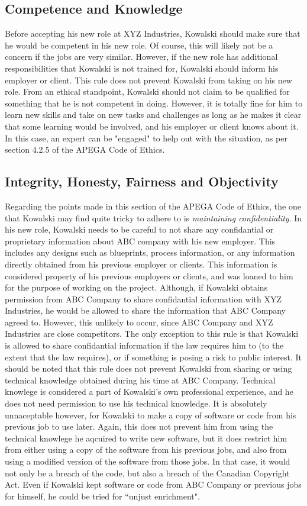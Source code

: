 \documentclass[letterpaper,12pt]{article}
\begin{document}
\subsection{Competence and Knowledge}
Before accepting his new role at XYZ Industries, Kowalski should make sure that he would be competent in his new role.
Of course, this will likely not be a concern if the jobs are very similar. However, if the new role has additional responsibilities that Kowalski
is not trained for, Kowalski should inform his employer or client. This rule does not prevent Kowalski from taking on his new role. From an ethical standpoint,
Kowalski should not claim to be qualified for something that he is not competent in doing. However, it is totally fine for him to learn new skills and take on
new tasks and challenges as long as he makes it clear that some learning would be involved, and his employer or client knows about it. 
In this case, an expert can be "engaged" to help out with the situation, as per section 4.2.5 of the APEGA Code of Ethics.\cite{apegacode}

\subsection{Integrity, Honesty, Fairness and Objectivity}
Regarding the points made in this section of the APEGA Code of Ethics, the one that Kowalski may find quite tricky to
adhere to is \textit{maintaining confidentiality}. In his new role, Kowalski needs to be careful to not share
any confidantial or proprietary information about ABC company with his new employer. This includes any designs such as blueprints,
process information, or any information directly obtained from his previous employer or clients. 
This information is considered property of his previous employers or clients, and was loaned to him for the purpose of working on the project.
Although, if Kowalski obtains permission from ABC Company to share confidantial information with XYZ Industries, he would be allowed to share the information that ABC Company agreed to. 
However, this unlikely to occur, since ABC Company and XYZ Industries are close competitors. The only exception to this rule is that Kowalski is allowed to share confidantial information 
if the law requires him to (to the extent that the law requires), or if something is posing a risk to public interest. It should be noted that this
rule does not prevent Kowalski from sharing or using technical knowledge obtained during his time at ABC Company. Technical knowlege is considered a part of
Kowalski's own professional experience, and he does not need permission to use his technical knowledge. It is absolutely unnaceptable however, for Kowalski to make a copy of
software or code from his previous job to use later. Again, this does not prevent him from using the technical knowlege he aqcuired to write new software, 
but it does restrict him from either using a copy of the software from his previous jobs, and also from using a modified version of the software
from those jobs. In that case, it would not only be a breach of the code, but also a breach of the Canadian Copyright Act\cite{copyrightact}.
Even if Kowalski kept software or code from ABC Company or previous jobs for himself, he could be tried for ``unjust enrichment".\cite{apegacode}
\end{document}
